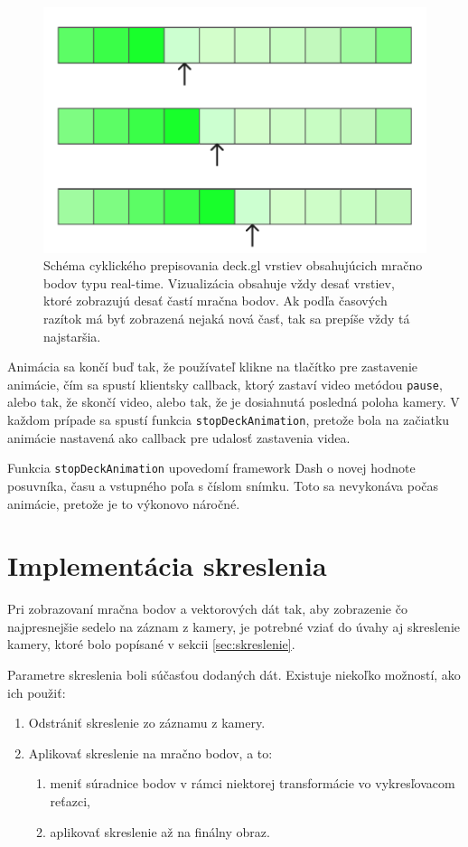 \begin{figure}[h]
    \centering
    \includegraphics[width=0.4\linewidth]{text_prace/obrazky-figures/vrstvy_animacia.pdf}
    \caption{Schéma cyklického prepisovania deck.gl vrstiev obsahujúcich mračno bodov typu real-time. Vizualizácia obsahuje vždy desať vrstiev, ktoré zobrazujú desať častí mračna bodov. Ak podľa časových razítok má byť zobrazená nejaká nová časť, tak sa prepíše vždy tá najstaršia.}
    \label{fig:vrstvy_animacia}
\end{figure}

Animácia sa končí buď tak, že používateľ klikne na tlačítko pre zastavenie animácie, čím sa spustí klientsky callback, ktorý zastaví video metódou \texttt{pause}, alebo tak, že skončí video, alebo tak, že je dosiahnutá posledná poloha kamery. V každom prípade sa spustí funkcia \texttt{stopDeckAnimation}, pretože bola na začiatku animácie nastavená ako callback pre udalosť zastavenia videa.

Funkcia \texttt{stopDeckAnimation} upovedomí framework Dash o novej hodnote posuvníka, času a vstupného poľa s číslom snímku. Toto sa nevykonáva počas animácie, pretože je to výkonovo náročné.

\section{Implementácia skreslenia}
\label{sec:implementacia_skreslenia}

Pri zobrazovaní mračna bodov a vektorových dát tak, aby zobrazenie čo najpresnejšie sedelo na záznam z kamery, je potrebné vziať do úvahy aj skreslenie kamery, ktoré bolo popísané v sekcii \ref{sec:skreslenie}. 

Parametre skreslenia boli súčasťou dodaných dát. Existuje niekoľko možností, ako ich použiť:
\begin{enumerate}
    \item Odstrániť skreslenie zo záznamu z kamery.
    \item Aplikovať skreslenie na mračno bodov, a to:
    \begin{enumerate}
        \item meniť súradnice bodov v rámci niektorej transformácie vo vykresľovacom reťazci,
        \item aplikovať skreslenie až na finálny obraz.
    \end{enumerate}
\end{enumerate}

